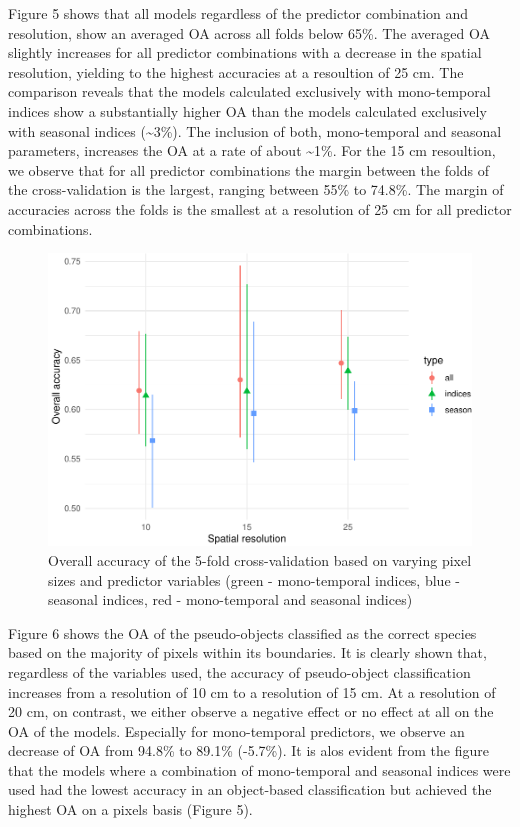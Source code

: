 \documentclass[]{article}
\begin{document}
Figure 5 shows that all models regardless of the predictor combination
and resolution, show an averaged OA across all folds below 65\%. The
averaged OA slightly increases for all predictor combinations with a
decrease in the spatial resolution, yielding to the highest accuracies
at a resoultion of 25 cm. The comparison reveals that the models
calculated exclusively with mono-temporal indices show a substantially
higher OA than the models calculated exclusively with seasonal indices
(\textasciitilde{}3\%). The inclusion of both, mono-temporal and
seasonal parameters, increases the OA at a rate of about
\textasciitilde{}1\%. For the 15 cm resoultion, we observe that for all
predictor combinations the margin between the folds of the
cross-validation is the largest, ranging between 55\% to 74.8\%. The
margin of accuracies across the folds is the smallest at a resolution of
25 cm for all predictor combinations.

\begin{figure}[H]

{\centering \includegraphics[width=0.8\linewidth]{report_files/figure-latex/result_plots-1} 

}

\caption{Overall accuracy of the 5-fold cross-validation based on varying pixel sizes and predictor variables (green - mono-temporal indices, blue - seasonal indices, red - mono-temporal and seasonal indices)}\label{fig:result_plots}
\end{figure}

Figure 6 shows the OA of the pseudo-objects classified as the correct
species based on the majority of pixels within its boundaries. It is
clearly shown that, regardless of the variables used, the accuracy of
pseudo-object classification increases from a resolution of 10 cm to a
resolution of 15 cm. At a resolution of 20 cm, on contrast, we either
observe a negative effect or no effect at all on the OA of the models.
Especially for mono-temporal predictors, we observe an decrease of OA
from 94.8\% to 89.1\% (-5.7\%). It is alos evident from the figure that
the models where a combination of mono-temporal and seasonal indices
were used had the lowest accuracy in an object-based classification but
achieved the highest OA on a pixels basis (Figure 5).
\end{document}

